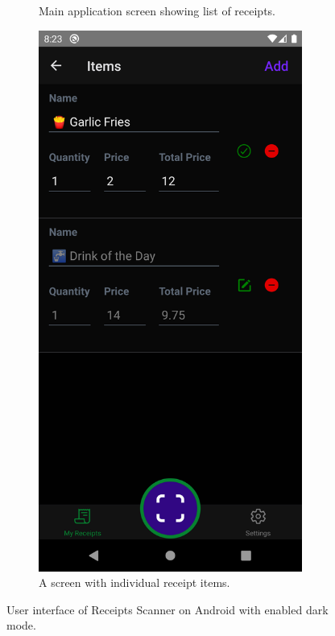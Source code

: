 \documentclass[
  digital, %
  table,   %
  oneside, %
  lof,     %
  lot,     %
]{fithesis3}
\newcommand\half{0.45}
\newcommand\subfigsize{0.95}
\begin{document}
\begin{figure}
\begin{subfigure}[t]{\half\textwidth}
      \caption{Main application screen showing list of receipts.}
    \end{subfigure}
    \begin{subfigure}[t]{\half\textwidth}
      \centering
      \includegraphics[width=\subfigsize\textwidth]{figures/screens/android/dark/items}
      \caption{A screen with individual receipt items.}
    \end{subfigure}
    \caption{User interface of Receipts Scanner on Android with enabled dark mode.}
    \label{fig:dark_mode_android}
\end{figure}
\end{document}

